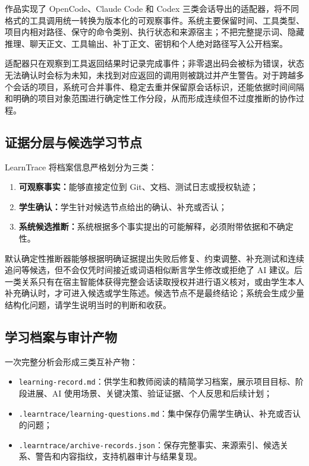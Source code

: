 \documentclass[UTF8,a4paper,12pt]{ctexart}
\begin{document}
作品实现了 OpenCode、Claude Code 和 Codex 三类会话导出的适配器，将不同格式的工具调用统一转换为版本化的可观察事件。系统主要保留时间、工具类型、项目内相对路径、保守的命令类别、执行状态和来源宿主；不把完整提示词、隐藏推理、聊天正文、工具输出、补丁正文、密钥和个人绝对路径写入公开档案。

适配器只在观察到工具返回结果时记录完成事件；非零退出码会被标为错误，状态无法确认时会标为未知，未找到对应返回的调用则被跳过并产生警告。对于跨越多个会话的项目，系统可合并事件、稳定去重并保留原会话标识，还能依据时间间隔和明确的项目对象范围进行确定性工作分段，从而形成连续但不过度推断的协作过程。

\subsection{证据分层与候选学习节点}

LearnTrace 将档案信息严格划分为三类：

\begin{enumerate}
  \item \textbf{可观察事实：}能够直接定位到 Git、文档、测试日志或授权轨迹；
  \item \textbf{学生确认：}学生针对候选节点给出的确认、补充或否认；
  \item \textbf{系统候选推断：}系统根据多个事实提出的可能解释，必须附带依据和不确定性。
\end{enumerate}

默认确定性推断器能够根据明确证据提出失败后修复、约束调整、补充测试和连续追问等候选，但不会仅凭时间接近或词语相似断言学生修改或拒绝了 AI 建议。后一类关系只有在宿主智能体获得完整会话读取授权并进行语义核对，或由学生本人补充确认时，才可进入候选或学生陈述。候选节点不是最终结论；系统会生成少量结构化问题，请学生说明当时的判断和收获。

\subsection{学习档案与审计产物}

一次完整分析会形成三类互补产物：

\begin{itemize}
  \item \texttt{learning-record.md}：供学生和教师阅读的精简学习档案，展示项目目标、阶段进展、AI 使用场景、关键决策、验证证据、个人反思和后续计划；
  \item \texttt{.learntrace/learning-questions.md}：集中保存仍需学生确认、补充或否认的问题；
  \item \texttt{.learntrace/archive-records.json}：保存完整事实、来源索引、候选关系、警告和内容指纹，支持机器审计与结果复现。
\end{itemize}
\end{document}
